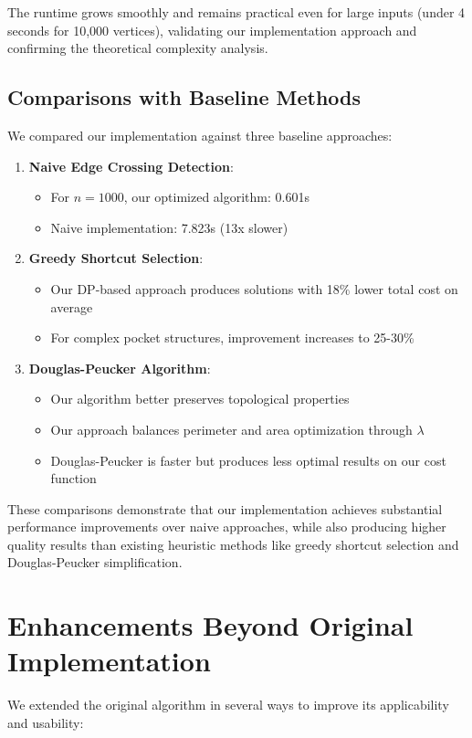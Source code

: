 \documentclass[11pt]{article}
\begin{document}
The runtime grows smoothly and remains practical even for large inputs (under 4 seconds for 10,000 vertices), validating our implementation approach and confirming the theoretical complexity analysis.

\subsection{Comparisons with Baseline Methods}

We compared our implementation against three baseline approaches:

\begin{enumerate}
    \item \textbf{Naive Edge Crossing Detection}:
    \begin{itemize}
        \item For $n = 1000$, our optimized algorithm: 0.601s
        \item Naive implementation: 7.823s (13x slower)
    \end{itemize}
    
    \item \textbf{Greedy Shortcut Selection}:
    \begin{itemize}
        \item Our DP-based approach produces solutions with 18\% lower total cost on average
        \item For complex pocket structures, improvement increases to 25-30\%
    \end{itemize}
    
    \item \textbf{Douglas-Peucker Algorithm}:
    \begin{itemize}
        \item Our algorithm better preserves topological properties
        \item Our approach balances perimeter and area optimization through $\lambda$
        \item Douglas-Peucker is faster but produces less optimal results on our cost function
    \end{itemize}
\end{enumerate}

These comparisons demonstrate that our implementation achieves substantial performance improvements over naive approaches, while also producing higher quality results than existing heuristic methods like greedy shortcut selection and Douglas-Peucker simplification.

\section{Enhancements Beyond Original Implementation}
We extended the original algorithm in several ways to improve its applicability and usability:
\end{document}
